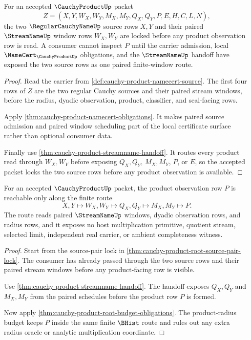 \begin{theorem}
\label{thm:cauchy-product-root-source-pair-lock}
For an accepted $\CauchyProductUp$ packet
$$
Z=(X,Y,W_X,W_Y,M_X,M_Y,Q_X,Q_Y,P,E,H,C,L,N),
$$
the two $\RegularCauchyNameUp$ source rows $X,Y$ and their paired $\StreamNameUp$ window rows $W_X,W_Y$ are locked before any product observation row is read. A consumer cannot inspect $P$ until the carrier admission, local $\NameCert_{\CauchyProductUp}$ obligations, and the $\StreamNameUp$ handoff have exposed the two source rows as one paired finite-window route.
\end{theorem}
\begin{proof}
Read the carrier from \autoref{def:cauchy-product-namecert-source}. The first four rows of $Z$ are the two regular Cauchy sources and their paired stream windows, before the radius, dyadic observation, product, classifier, and seal-facing rows.

Apply \autoref{thm:cauchy-product-namecert-obligations}. It makes paired source admission and paired window scheduling part of the local certificate surface rather than optional consumer data.

Finally use \autoref{thm:cauchy-product-streamname-handoff}. It routes every product read through $W_X,W_Y$ before exposing $Q_X,Q_Y$, $M_X,M_Y$, $P$, or $E$, so the accepted packet locks the two source rows before any product observation is available.
\end{proof}

\begin{theorem}
\label{thm:cauchy-product-root-product-observation-route}
For an accepted $\CauchyProductUp$ packet, the product observation row $P$ is reachable only along the finite route
$$
X,Y \longmapsto W_X,W_Y \longmapsto Q_X,Q_Y \longmapsto M_X,M_Y \longmapsto P.
$$
The route reads paired $\StreamNameUp$ windows, dyadic observation rows, and radius rows, and it exposes no host multiplication primitive, quotient stream, selected limit, independent real carrier, or ambient completeness witness.
\end{theorem}
\begin{proof}
Start from the source-pair lock in \autoref{thm:cauchy-product-root-source-pair-lock}. The consumer has already passed through the two source rows and their paired stream windows before any product-facing row is visible.

Use \autoref{thm:cauchy-product-streamname-handoff}. The handoff exposes $Q_X,Q_Y$ and $M_X,M_Y$ from the paired schedules before the product row $P$ is formed.

Now apply \autoref{thm:cauchy-product-root-budget-obligations}. The product-radius budget keeps $P$ inside the same finite $\BHist$ route and rules out any extra radius oracle or analytic multiplication coordinate.
\end{proof}

